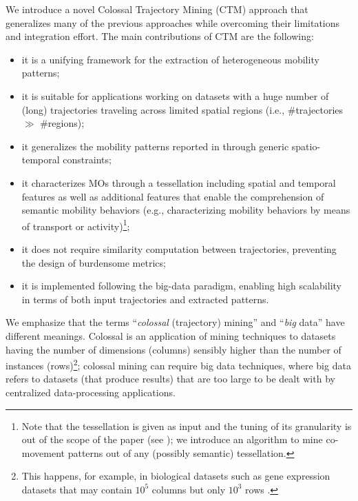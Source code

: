 \documentclass[
]{ceurart}
\begin{document}
We introduce a novel Colossal Trajectory Mining (CTM) approach that generalizes many of the previous approaches while overcoming their limitations and integration effort. 
The main contributions of CTM are the following:
\begin{itemize}
    \item it is a unifying framework for the extraction of heterogeneous mobility patterns;
    \item it is suitable for applications working on datasets with a huge number of (long) trajectories traveling across limited spatial regions (i.e., \#trajectories $\gg$ \#regions);
    \item it generalizes the mobility patterns reported in  through generic spatio-temporal constraints;
    \item it characterizes MOs through a tessellation including spatial and temporal features as well as additional features that enable the comprehension of semantic mobility behaviors \citep{DBLP:journals/tist/Yan0PSA13} (e.g., characterizing mobility behaviors by means of transport or activity)\footnote{Note that the tessellation is given as input and the tuning of its granularity is out of the scope of the paper (see ); we introduce an algorithm to mine co-movement patterns out of any (possibly semantic) tessellation.};
    \item it does not require similarity computation between trajectories, preventing the design of burdensome metrics;
    \item it is implemented following the big-data paradigm, enabling high scalability in terms of both input trajectories and extracted patterns.
\end{itemize}
We emphasize that the terms ``\textit{colossal} (trajectory) mining'' and ``\textit{big} data'' have different meanings. Colossal \citep{DBLP:conf/kdd/PanCTYZ03} is an application of mining techniques to datasets having the number of dimensions (columns) sensibly higher than the number of instances (rows)\footnote{This happens, for example, in biological datasets such as gene expression datasets that may contain $10^5$ columns but only $10^3$ rows \citep{DBLP:conf/kdd/PanCTYZ03}.}; colossal mining can require big data techniques, where big data refers to datasets (that produce results) that are too large to be dealt with by centralized data-processing applications.
\end{document}
